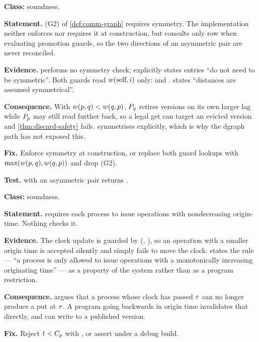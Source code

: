 \begin{deviation}\label{dev:asymmetric}
\textbf{Class:} soundness.

\textbf{Statement.} (G2) of \cref{def:comm-graph} requires symmetry. The
implementation neither enforces nor requires it at construction, but consults
only row  when evaluating promotion guards, so the two directions
of an asymmetric pair are never reconciled.

\textbf{Evidence.}  performs no
symmetry check;  explicitly states entries ``do not need
to be symmetric''. Both guards read $w(\text{self},i)$ only:
 and . \cite{dstm2026} states
``distances are assumed symmetrical''.

\textbf{Consequence.} With $w(p,q) < w(q,p)$, $P_{q}$ retires
\glspl{version} on its own larger lag while $P_{p}$ may still read
further back, so a legal get can target an evicted version and
\cref{thm:discard-safety} fails. 
symmetrises explicitly, which is why the dgraph path has not exposed this.

\textbf{Fix.} Enforce symmetry at construction, or replace both guard lookups
with $\max(w(p,q), w(q,p))$ and drop (G2).

\textbf{Test.}  with an asymmetric pair returns
.
\end{deviation}

\begin{deviation}\label{dev:monotone-origin}
\textbf{Class:} soundness.

\textbf{Statement.}  requires each process to issue \glspl{operation}
with nondecreasing \gls{origin-time}. Nothing checks it.

\textbf{Evidence.} The clock update is guarded by
(, ), so an operation with a smaller
origin time is accepted silently and simply fails to move the clock.
\cite{dstm2026} states the rule --- ``a process is only allowed to issue
operations with a monotonically increasing originating time'' --- as a
property of the system rather than as a program restriction.

\textbf{Consequence.}  argues that a process whose
clock has passed $\tau$ can no longer produce a put at $\tau$. A program going
backwards in origin time invalidates that directly, and can write to a
published \gls{version}.

\textbf{Fix.} Reject $t < C_{p}$ with , or assert under a
debug build.
\end{deviation}

